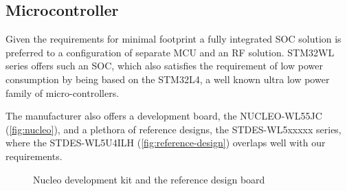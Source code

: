 \subsection{\label{section:mcu}Microcontroller}
Given the requirements for minimal footprint a fully integrated SOC solution is preferred to a configuration of separate MCU and an RF solution. STM32WL series offers such an SOC, which also satisfies the requirement of low power consumption by being based on the STM32L4, a well known ultra low power family of micro-controllers.

The manufacturer also offers a development board, the NUCLEO-WL55JC (\ref{fig:nucleo}), and a plethora of reference designs, the STDES-WL5xxxxx series, where the STDES-WL5U4ILH (\ref{fig:reference-design}) overlaps well with our requirements.

\begin{figure}
    \centering
    \caption{\label{fig:nucleo-and-reference} Nucleo development kit and the reference design board}
\end{figure}

